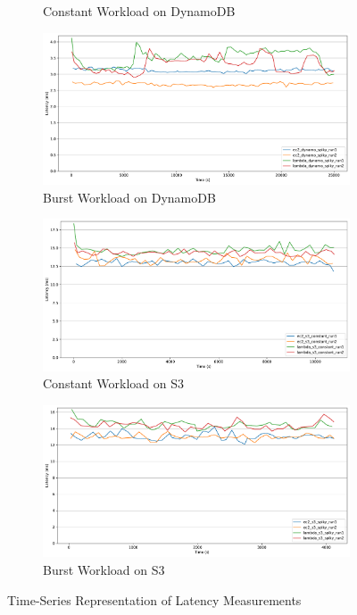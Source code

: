 \begin{figure}[h]
\begin{subfigure}{0.49\linewidth}
		\caption{Constant Workload on DynamoDB}
		\label{fig:ts_ddb_const}
	\end{subfigure}
	\hfill
	\begin{subfigure}{0.49\linewidth}
		\centering
		\includegraphics[width=\linewidth]{./fig/ts-dynamo-bursty.pdf}
		\caption{Burst Workload on DynamoDB}
		\label{fig:ts_ddb_bursty}
	\end{subfigure}
	\vfill
	\begin{subfigure}{0.49\linewidth}
		\centering
		\includegraphics[width=\linewidth]{./fig/ts-s3-constant.pdf}
		\caption{Constant Workload on S3}
		\label{fig:ts_s3_const}
	\end{subfigure}
	\hfill
	\begin{subfigure}{0.49\linewidth}
		\centering
		\includegraphics[width=\linewidth]{./fig/ts-s3-bursty.pdf}
		\caption{Burst Workload on S3}
		\label{fig:ts_s3_bursty}
	\end{subfigure}
	\caption{Time-Series Representation of Latency Measurements}
	\label{fig:ts-plots}
\end{figure}
